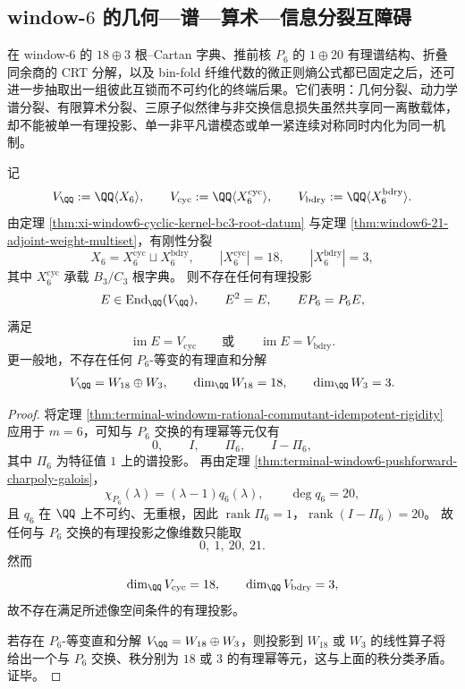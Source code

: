 \subsection{window-\texorpdfstring{$6$}{6} 的几何—谱—算术—信息分裂互障碍}\label{subsec:conclusion-window6-geometry-spectrum-arithmetic-information-obstructions}

在 window-\(6\) 的 \(18\oplus 3\) 根--Cartan 字典、推前核 \(P_6\) 的 \(1\oplus 20\) 有理谱结构、折叠同余商的 CRT 分解，以及 bin-fold 纤维代数的微正则熵公式都已固定之后，还可进一步抽取出一组彼此互锁而不可约化的终端后果。它们表明：几何分裂、动力学谱分裂、有限算术分裂、三原子似然律与非交换信息损失虽然共享同一离散载体，却不能被单一有理投影、单一非平凡谱模态或单一紧连续对称同时内化为同一机制。

\begin{theorem}\label{thm:conclusion-window6-geometric-splitting-rational-dynamical-invisibility}
记
\[
V_{\QQ}:=\QQ\langle X_6\rangle,\qquad
V_{\mathrm{cyc}}:=\QQ\langle X_6^{\mathrm{cyc}}\rangle,\qquad
V_{\mathrm{bdry}}:=\QQ\langle X_6^{\mathrm{bdry}}\rangle.
\]
由定理 \ref{thm:xi-window6-cyclic-kernel-bc3-root-datum} 与定理 \ref{thm:window6-21-adjoint-weight-multiset}，有刚性分裂
\[
X_6=X_6^{\mathrm{cyc}}\sqcup X_6^{\mathrm{bdry}},
\qquad
|X_6^{\mathrm{cyc}}|=18,
\qquad
|X_6^{\mathrm{bdry}}|=3,
\]
其中 \(X_6^{\mathrm{cyc}}\) 承载 \(B_3/C_3\) 根字典。
则不存在任何有理投影
\[
E\in \operatorname{End}_{\QQ}(V_{\QQ}),
\qquad
E^2=E,
\qquad
EP_6=P_6E,
\]
满足
\[
\operatorname{im}E=V_{\mathrm{cyc}}
\qquad\text{或}\qquad
\operatorname{im}E=V_{\mathrm{bdry}}.
\]
更一般地，不存在任何 \(P_6\)-等变的有理直和分解
\[
V_{\QQ}=W_{18}\oplus W_3,
\qquad
\dim_{\QQ}W_{18}=18,
\qquad
\dim_{\QQ}W_3=3.
\]
\end{theorem}
\begin{proof}
将定理 \ref{thm:terminal-windowm-rational-commutant-idempotent-rigidity} 应用于 \(m=6\)，可知与 \(P_6\) 交换的有理幂等元仅有
\[
0,\qquad I,\qquad \Pi_6,\qquad I-\Pi_6,
\]
其中 \(\Pi_6\) 为特征值 \(1\) 上的谱投影。
再由定理 \ref{thm:terminal-window6-pushforward-charpoly-galois}，
\[
\chi_{P_6}(\lambda)=(\lambda-1)q_6(\lambda),
\qquad
\deg q_6=20,
\]
且 \(q_6\) 在 \(\QQ\) 上不可约、无重根，因此 \(\operatorname{rank}\Pi_6=1\)，\(\operatorname{rank}(I-\Pi_6)=20\)。
故任何与 \(P_6\) 交换的有理投影之像维数只能取
\[
0,\ 1,\ 20,\ 21.
\]
然而
\[
\dim_{\QQ}V_{\mathrm{cyc}}=18,
\qquad
\dim_{\QQ}V_{\mathrm{bdry}}=3,
\]
故不存在满足所述像空间条件的有理投影。

若存在 \(P_6\)-等变直和分解 \(V_{\QQ}=W_{18}\oplus W_3\)，则投影到 \(W_{18}\) 或 \(W_3\) 的线性算子将给出一个与 \(P_6\) 交换、秩分别为 \(18\) 或 \(3\) 的有理幂等元，这与上面的秩分类矛盾。证毕。
\end{proof}


